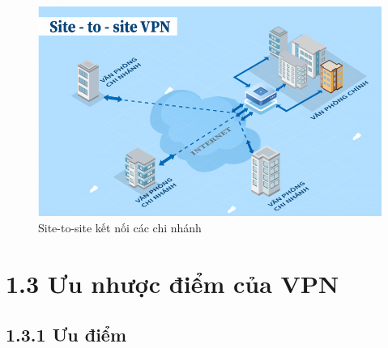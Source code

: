     \begin{figure}[htbp]
        \centering
        \includegraphics[width=0.6\linewidth]{img/vpn-site-to-site.jpeg}
        \caption{Site-to-site kết nối các chi nhánh}
    \end{figure}

    
    \section*{1.3 Ưu nhược điểm của VPN}
    \subsection*{1.3.1 Ưu điểm}

